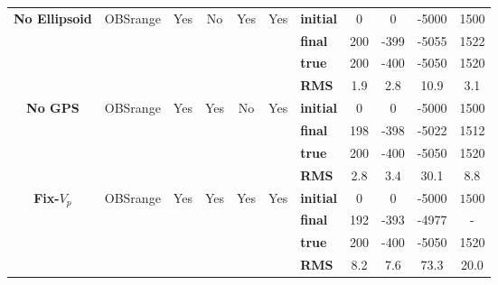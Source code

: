 \begin{table}
{\begin{tabular}{c | c c c c c | l c c c c}
\hline
\multirow{4}{*}{\textbf{No Ellipsoid}} & \multirow{4}{*}{OBSrange} & \multirow{4}{*}{Yes} & \multirow{4}{*}{No} & \multirow{4}{*}{Yes} & \multirow{4}{*}{Yes} & \textbf{initial} & 0 & 0 & -5000 & 1500 \\ 
\multirow{4}{*}{} & \multirow{4}{*}{} & \multirow{4}{*}{} & \multirow{4}{*}{} & \multirow{4}{*}{} & \multirow{4}{*}{} & \textbf{final}& 200 & -399 & -5055 & 1522 \\ 
\multirow{4}{*}{} & \multirow{4}{*}{} & \multirow{4}{*}{} & \multirow{4}{*}{} & \multirow{4}{*}{} & \multirow{4}{*}{} & \textbf{true}& 200 & -400 & -5050 & 1520 \\ 
\multirow{4}{*}{} & \multirow{4}{*}{} & \multirow{4}{*}{} & \multirow{4}{*}{} & \multirow{4}{*}{} & \multirow{4}{*}{} & \textbf{RMS} & 1.9 & 2.8 & 10.9 & 3.1 \\ 
\hline
\multirow{4}{*}{\textbf{No GPS}} & \multirow{4}{*}{OBSrange} & \multirow{4}{*}{Yes} & \multirow{4}{*}{Yes} & \multirow{4}{*}{No} & \multirow{4}{*}{Yes} & \textbf{initial} & 0 & 0 & -5000 & 1500 \\ 
\multirow{4}{*}{} & \multirow{4}{*}{} & \multirow{4}{*}{} & \multirow{4}{*}{} & \multirow{4}{*}{} & \multirow{4}{*}{} & \textbf{final}& 198 & -398 & -5022 & 1512 \\ 
\multirow{4}{*}{} & \multirow{4}{*}{} & \multirow{4}{*}{} & \multirow{4}{*}{} & \multirow{4}{*}{} & \multirow{4}{*}{} & \textbf{true}& 200 & -400 & -5050 & 1520 \\ 
\multirow{4}{*}{} & \multirow{4}{*}{} & \multirow{4}{*}{} & \multirow{4}{*}{} & \multirow{4}{*}{} & \multirow{4}{*}{} & \textbf{RMS} & 2.8 & 3.4 & 30.1 & 8.8 \\ 
\hline
\multirow{4}{*}{\textbf{Fix-$V_p$}} & \multirow{4}{*}{OBSrange} & \multirow{4}{*}{Yes} & \multirow{4}{*}{Yes} & \multirow{4}{*}{Yes} & \multirow{4}{*}{Yes} & \textbf{initial} & 0 & 0 & -5000 & $\mathit{1500}$ \\ 
\multirow{4}{*}{} & \multirow{4}{*}{} & \multirow{4}{*}{} & \multirow{4}{*}{} & \multirow{4}{*}{} & \multirow{4}{*}{} & \textbf{final}& 192 & -393 & -4977 & - \\ 
\multirow{4}{*}{} & \multirow{4}{*}{} & \multirow{4}{*}{} & \multirow{4}{*}{} & \multirow{4}{*}{} & \multirow{4}{*}{} & \textbf{true}& 200 & -400 & -5050 & 1520 \\ 
\multirow{4}{*}{} & \multirow{4}{*}{} & \multirow{4}{*}{} & \multirow{4}{*}{} & \multirow{4}{*}{} & \multirow{4}{*}{} & \textbf{RMS} & 8.2 & 7.6 & 73.3 & 20.0 \\ 
\hline

\end{tabular}}
\end{table}
